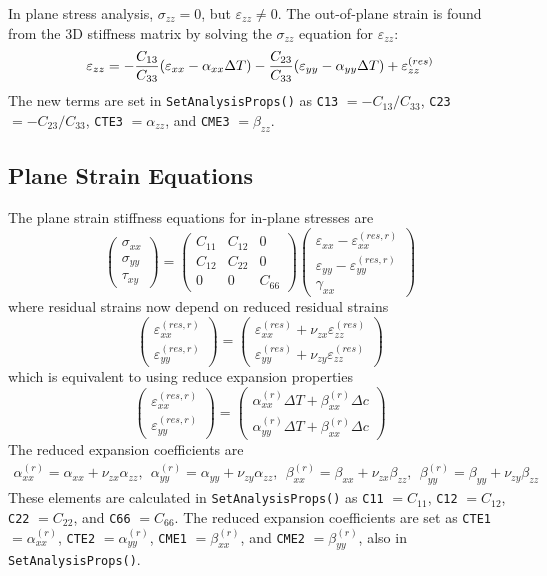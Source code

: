 \documentclass[11pt]{article}
\def\a#1{\alpha_{#1}}
\def\b#1{\beta_{#1}}
\def\code#1{{\small\tt #1}}
\def\DT{\Delta T}
\def\e#1{\varepsilon_{#1}}
\def\er#1{\varepsilon_{#1}^{(res)}}
\def\err#1{\varepsilon_{#1}^{(res,r)}}
\def\g#1{\gamma_{#1}}
\def\s#1{\sigma_{#1}}
\def\t#1{\tau_{#1}}
\def\v#1{\nu_{#1}}
\def\vvec#1#2#3{\left(\begin{array}{ccc} #1 \\ #2 \\ #3 \end{array}\right)}
\def\symmat#1#2#3#4#5#6{\left(\begin{array}{ccc} #1 & #2 & #3 \\ #2 & #4 & #5 \\
                                                      #3 & #5 & #6 \end{array}\right)}
\begin{document}
In plane stress analysis, $\s{zz}=0$, but $\e{zz}\ne0$. The out-of-plane strain is found from the 3D stiffness matrix by solving the $\s{zz}$ equation for $\e{zz}$:
\begin{equation}
            \e{zz} = -{C_{13}\over C_{33}}(\e{xx} -\a{xx}\DT) - {C_{23}\over C_{33}}(\e{yy} -\a{yy}\DT) 
                     + \er{zz}
\end{equation}
The new terms are set in \code{SetAnalysisProps()} as \code{C13} $=-C_{13}/C_{33}$, \code{C23} $=-C_{23}/C_{33}$, \code{CTE3} $=\a{zz}$, and \code{CME3} $=\b{zz}$.

\subsection{Plane Strain Equations}

The plane strain stiffness equations for in-plane stresses are
\begin{equation}
      \vvec{\s{xx}}{\s{yy}}{\t{xy}} = \symmat{C_{11}}{C_{12}}{0}{C_{22}}{0}{C_{66}}
          \vvec{\e{xx} -\err{xx}}{\e{yy} - \err{yy}}{\g{xx}}
 \end{equation}
 where residual strains now depend on reduced residual strains
\begin{equation}
\left(\begin{array}{c} \err{xx} \\ \err{yy}  \end{array}\right)
       =  \left(\begin{array}{c}
	 \er{xx} + \v{zx}\er{zz} \\
	\er{yy} + \v{zy}\er{zz} \end{array}\right)
\end{equation}
which is equivalent to using reduce expansion properties
\begin{equation}
\left(\begin{array}{c} \err{xx} \\ \err{yy}  \end{array}\right)
       =  \left(\begin{array}{c}
	 \a{xx}^{(r)}\DT + \b{xx}^{(r)}\Delta c \\
	\a{yy}^{(r)}\DT + \b{xx}^{(r)}\Delta c \end{array}\right)
\end{equation}
The reduced expansion coefficients are
\begin{eqnarray}%
   \a{xx}^{(r)} = \a{xx} + \v{zx}\a{zz}, \ \ 
   \a{yy}^{(r)} = \a{yy} + \v{zy}\a{zz}, \ \ 
   \b{xx}^{(r)} = \b{xx} + \v{zx}\b{zz}, \ \ 
   \b{yy}^{(r)} = \b{yy} + \v{zy}\b{zz}
\end{eqnarray}%
These elements are calculated in \code{SetAnalysisProps()} as \code{C11} $=C_{11}$, \code{C12}  $=C_{12}$, \code{C22} $=C_{22}$, and \code{C66} $=C_{66}$. The reduced expansion coefficients are set as \code{CTE1} $=\a{xx}^{(r)}$, \code{CTE2} $=\a{yy}^{(r)}$, \code{CME1} $=\b{xx}^{(r)}$, and \code{CME2} $=\b{yy}^{(r)}$, also in \code{SetAnalysisProps()}.
\end{document}
